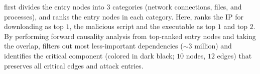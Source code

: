 \tool first divides the entry nodes into $3$ categories (\ie network connections, files, and processes), and ranks the entry nodes in each category.
Here, \tool ranks the IP  for  downloading as top $1$, the malicious script  and the executable 
as top $1$ and top $2$.
By performing forward causality analysis from top-ranked entry nodes and taking the overlap, \tool filters out most less-important dependencies ($\sim 3$ million) and identifies the critical component (colored in dark black; $10$ nodes, $12$ edges) that preserves all critical edges and attack entries.

